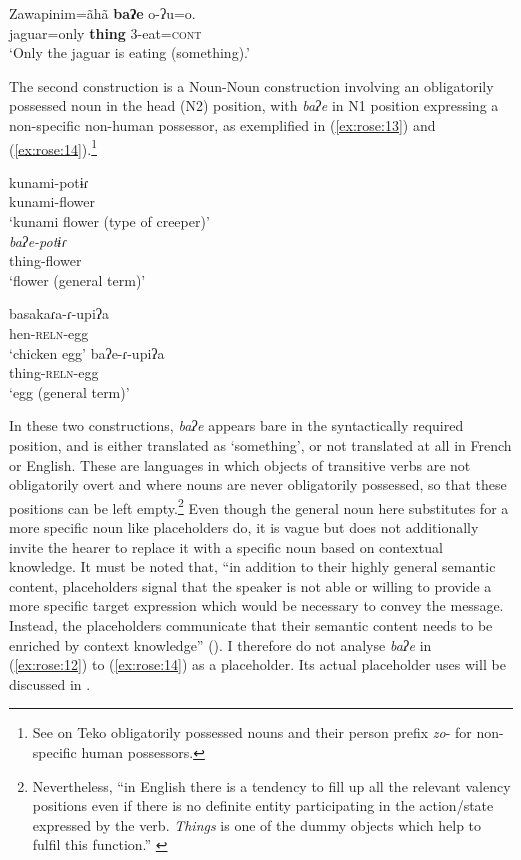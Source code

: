 \documentclass[output=paper]{langscibook}
\begin{document}
\ea \label{ex:rose:12}
\gll Zawapinim=ãhã  \textbf{baʔe}  o-ʔu=o.\\
jaguar=only  \textbf{thing}  3-eat=\textsc{cont}\\
\glt ‘Only the jaguar is eating (something).’ 
\z 

The second construction is a Noun-Noun construction involving an obligatorily possessed noun in the head (N2) position, with \textit{baʔe} in N1 position expressing a non-specific non-human possessor, as exemplified in (\ref{ex:rose:13}) and (\ref{ex:rose:14}).\footnote{See \citet[28; 161]{Rose2011} on Teko obligatorily possessed nouns and their person prefix \textit{zo}{}- for non-specific human possessors.}

\ea \label{ex:rose:13}
\ea \gll kunami-potɨɾ\\
         kunami-flower \\
 \glt    ‘kunami flower (type of creeper)’\\
\ex \textit{baʔe-potɨɾ} \\
          thing-flower\\
\glt       ‘flower (general term)’\\
\z
\z

\ea \label{ex:rose:14}
\ea \gll basakaɾa-ɾ{}-upiʔa\\
hen-\textsc{reln}{}-egg \\
\glt ‘chicken egg’
\ex \gll baʔe-ɾ{}-upiʔa\\
         thing-\textsc{reln}{}-egg \\
      \glt ‘egg (general term)’
\z\z 

In these two constructions, \textit{baʔe} appears bare in the syntactically required position, and is either translated as ‘something’, or not translated at all in French or English. These are languages in which objects of transitive verbs are not obligatorily overt and where nouns are never obligatorily possessed, so that these positions can be left empty.\footnote{Nevertheless, “in English there is a tendency to fill up all the relevant valency positions even if there is no definite entity participating in the action/state expressed by the verb. \textit{Things} is one of the dummy objects which help to fulfil this function.” \citep[643]{Fronek1982}}
Even though the general noun here substitutes for a more specific noun like placeholders do, it is vague but does not additionally invite the hearer to replace it with a specific noun based on contextual knowledge. It must be noted that, “in addition to their highly general semantic content, placeholders signal that the speaker is not able or willing to provide a more specific target expression which would be necessary to convey the message. Instead, the placeholders communicate that their semantic content needs to be enriched by context knowledge” (\citealt[300]{HenneckeHennecke2022}). I therefore do not analyse \textit{baʔe} in (\ref{ex:rose:12}) to (\ref{ex:rose:14}) as a placeholder. Its actual placeholder uses will be discussed in . 
\end{document}

